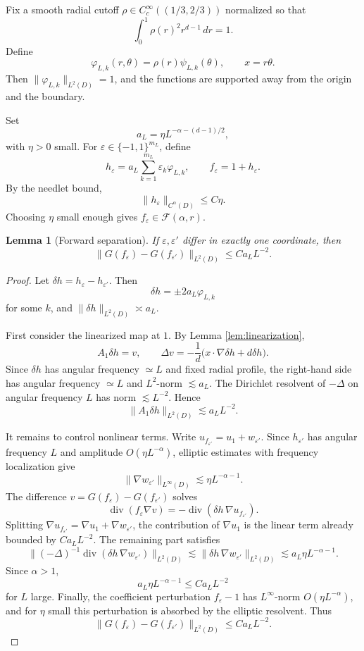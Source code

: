 \documentclass[11pt]{article}
\newtheorem{lemma}{Lemma}
\newcommand{\Div}{\operatorname{div}}
\newcommand{\cF}{\mathcal F}
\begin{document}
Fix a smooth radial cutoff \(\rho\in C_c^\infty((1/3,2/3))\) normalized so that
\[
 \int_0^1 \rho(r)^2 r^{d-1}\,dr=1.
\]
Define
\[
 \varphi_{L,k}(r,\theta)=\rho(r)\psi_{L,k}(\theta),
 \qquad x=r\theta.
\]
Then \(\|\varphi_{L,k}\|_{L^2(D)}=1\), and the functions are supported away from the origin and the boundary.

Set
\[
 a_L=\eta L^{-\alpha-(d-1)/2},
\]
with \(\eta>0\) small. For \(\varepsilon\in\{-1,1\}^{m_L}\), define
\[
 h_\varepsilon
 =
 a_L\sum_{k=1}^{m_L}\varepsilon_k\varphi_{L,k},
 \qquad
 f_\varepsilon=1+h_\varepsilon.
\]
By the needlet bound,
\[
 \|h_\varepsilon\|_{C^\alpha(D)}\le C\eta.
\]
Choosing \(\eta\) small enough gives \(f_\varepsilon\in\cF(\alpha,r)\).

\begin{lemma}[Forward separation]
\label{lem:forward-separation}
If \(\varepsilon,\varepsilon'\) differ in exactly one coordinate, then
\[
 \|G(f_\varepsilon)-G(f_{\varepsilon'})\|_{L^2(D)}
 \le
 C a_L L^{-2}.
\]
\end{lemma}

\begin{proof}
Let \(\delta h=h_\varepsilon-h_{\varepsilon'}\). Then
\[
 \delta h=\pm 2a_L\varphi_{L,k}
\]
for some \(k\), and \(\|\delta h\|_{L^2(D)}\asymp a_L\).

First consider the linearized map at \(1\). By Lemma \ref{lem:linearization},
\[
 A_1\delta h=v,\qquad
 \Delta v=-\frac1d\bigl(x\cdot\nabla \delta h+d\delta h\bigr).
\]
Since \(\delta h\) has angular frequency \(\simeq L\) and fixed radial profile, the right-hand side has angular frequency \(\simeq L\) and \(L^2\)-norm \(\lesssim a_L\). The Dirichlet resolvent of \(-\Delta\) on angular frequency \(L\) has norm \(\lesssim L^{-2}\). Hence
\[
 \|A_1\delta h\|_{L^2(D)}\lesssim a_LL^{-2}.
\]

It remains to control nonlinear terms. Write \(u_{f_{\varepsilon'}}=u_1+w_{\varepsilon'}\). Since \(h_{\varepsilon'}\) has angular frequency \(L\) and amplitude \(O(\eta L^{-\alpha})\), elliptic estimates with frequency localization give
\[
 \|\nabla w_{\varepsilon'}\|_{L^\infty(D)}
 \lesssim
 \eta L^{-\alpha-1}.
\]
The difference \(v=G(f_\varepsilon)-G(f_{\varepsilon'})\) solves
\[
 \Div(f_\varepsilon\nabla v)
 =
 -\Div(\delta h\,\nabla u_{f_{\varepsilon'}}).
\]
Splitting \(\nabla u_{f_{\varepsilon'}}=\nabla u_1+\nabla w_{\varepsilon'}\), the contribution of \(\nabla u_1\) is the linear term already bounded by \(Ca_LL^{-2}\). The remaining part satisfies
\[
 \|(-\Delta)^{-1}\Div(\delta h\,\nabla w_{\varepsilon'})\|_{L^2(D)}
 \lesssim
 \|\delta h\,\nabla w_{\varepsilon'}\|_{L^2(D)}
 \lesssim
 a_L \eta L^{-\alpha-1}.
\]
Since \(\alpha>1\),
\[
 a_L \eta L^{-\alpha-1}
 \le
 C a_LL^{-2}
\]
for \(L\) large. Finally, the coefficient perturbation \(f_\varepsilon-1\) has \(L^\infty\)-norm \(O(\eta L^{-\alpha})\), and for \(\eta\) small this perturbation is absorbed by the elliptic resolvent. Thus
\[
 \|G(f_\varepsilon)-G(f_{\varepsilon'})\|_{L^2(D)}
 \le
 C a_LL^{-2}.
\]
\end{proof}
\end{document}
